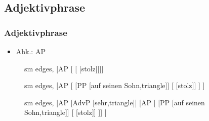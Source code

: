 \subsection{Adjektivphrase}

\begin{frame}
\frametitle{Adjektivphrase}

\begin{itemize}
	\item Abk.: AP
\end{itemize}

\begin{figure}[b]
	\begin{minipage}[b]{0.18\textwidth}
	\centering
	\footnotesize{
		\begin{forest}
		sm edges,
		[AP [ [ [stolz]]]]
		\end{forest}
		}
  	\end{minipage}  
  	\pause            
	\begin{minipage}[b]{0.03\textwidth}
	\hfill
  	\end{minipage}
  	\begin{minipage}[b]{0.30\textwidth}
	\centering
	\footnotesize{
		\begin{forest}
		sm edges,
		[AP [	[PP [auf seinen Sohn,triangle]]
						[\zerobar{A} [stolz]]
			]
		]			 
		\end{forest}
		}
  	\end{minipage}  
	\begin{minipage}[b]{0.03\textwidth}
	\hfill
  	\end{minipage}
  	\pause            
	\begin{minipage}[b]{0.41\textwidth}
	\centering
	\footnotesize{
		\begin{forest}
		sm edges,
		[AP [AdvP [sehr,triangle]]
			[AP 
		    [	[PP [auf seinen Sohn,triangle]]				
		    			[ [stolz]]
			]]
		]			 
		\end{forest}
		}
  	\end{minipage}
\end{figure}
\end{frame}


